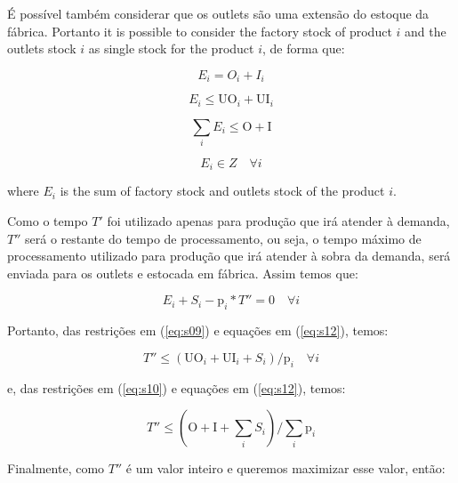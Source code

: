 \documentclass[authoryear,manuscript,12pt]{elsarticle}
\begin{document}
É possível também considerar que os outlets são uma extensão do estoque da fábrica. Portanto it is possible to consider the factory stock of product $i$ and the outlets stock $i$ as single stock for the product $i$, de forma que:

\begin{equation}
\label{eq:s08}
E_i = O_i + I_i
\end{equation}

\begin{equation}
\label{eq:s09}
E_i \leq \textrm{UO}_i + \textrm{UI}_i
\end{equation}

\begin{equation}
\label{eq:s10}
\sum_i {E_i} \leq \textrm{O} + \textrm{I}
\end{equation}

\begin{equation}
\label{eq:s11}
E_i \in Z \quad \forall i
\end{equation}

\noindent where $E_i$ is the sum of factory stock and outlets stock of the product $i$.

Como o tempo $T'$ foi utilizado apenas para produção que irá atender à demanda, $T''$ será o restante do tempo de processamento, ou seja, o tempo máximo de processamento utilizado para produção que irá atender à sobra da demanda, será enviada para os outlets e estocada em fábrica. Assim temos que:

\begin{equation}
\label{eq:s12}
E_i + S_i - \textrm{p}_i * T''  = 0 \quad \forall i
\end{equation}

Portanto, das restrições em (\ref{eq:s09}) e equações em (\ref{eq:s12}), temos:

\begin{equation}
\label{eq:s13}
T''  \leq (\textrm{UO}_i + \textrm{UI}_i + S_i) / \textrm{p}_i \quad \forall i
\end{equation}

\noindent e, das restrições em (\ref{eq:s10}) e equações em (\ref{eq:s12}), temos:

\begin{equation}
\label{eq:s14}
 T'' \leq (\textrm{O} + \textrm{I} + \sum_i S_i) / \sum_i \textrm{p}_i
\end{equation}

Finalmente, como $T''$ é um valor inteiro e queremos maximizar esse valor, então:
\end{document}
